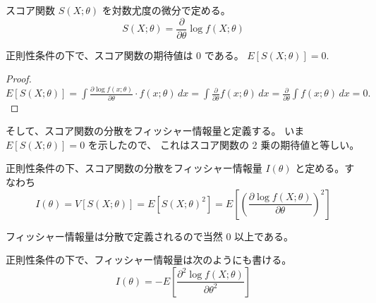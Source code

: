 \documentclass[./main.tex]{subfiles}
\begin{document}
\begin{enumerate}
        \begin{definition}[スコア関数]
            スコア関数 $S (X; \theta)$ を対数尤度の微分で定める。
            \begin{equation}
                S (X; \theta) = \frac{\partial}{\partial \theta} \log f(X; \theta)
            \end{equation}
        \end{definition}
        \begin{theorem}
            正則性条件の下で、スコア関数の期待値は $0$ である。 $E[ S(X; \theta) ] = 0.$
        \end{theorem}
        \begin{proof}
            \small
            $%
            E [S(X; \theta)] 
                = \int \frac{\partial \log f(x; \theta)}{\partial \theta} \cdot f(x; \theta) \, dx
                = \int \frac{\partial}{\partial \theta} f(x; \theta) \, dx
                = \frac{\partial}{\partial \theta} \int f(x; \theta) \, dx
                = 0.$
        \end{proof}
        そして、スコア関数の分散をフィッシャー情報量と定義する。
        いま $E [S(X; \theta)] = 0$ を示したので、 
        これはスコア関数の 2 乗の期待値と等しい。
        \begin{definition}[フィッシャー情報量]
            正則性条件の下、スコア関数の分散をフィッシャー情報量 $I (\theta)$ と定める。すなわち
            \begin{equation}\label{eq:2024-suri-1-fisher-def1}
                I (\theta) = V[ S(X; \theta) ] 
                    = E [ S(X; \theta)^2 ]
                    = E \left[ \left( \frac{\partial \log f(X; \theta) }{\partial \theta} \right)^2  \right]
            \end{equation}
        \end{definition}

        フィッシャー情報量は分散で定義されるので当然 $0$ 以上である。

        \begin{theorem}[フィッシャー情報量]
            正則性条件の下で、フィッシャー情報量は次のようにも書ける。
            \begin{equation}\label{eq:2024-suri-1-fisher-def2}
                I (\theta)
                    = - E \left[ \frac{\partial^2 \log f (X; \theta)}{\partial \theta^2} \right]
            \end{equation}
        \end{theorem}


\end{enumerate}
\end{document}
